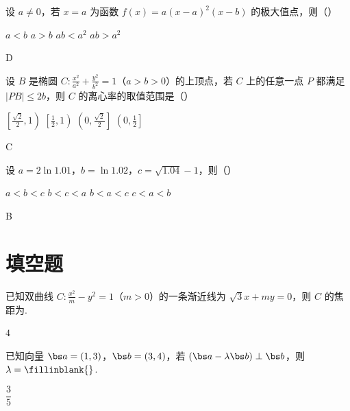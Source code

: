 \begin{problem}
设 \(a\ne 0\)，若 \(x=a\) 为函数 \(f(x)=a(x-a)^2(x-b)\) 的极大值点，则（\quad）

\choices
    {\(a<b\)}
    {\(a>b\)}
    {\(ab<a^2\)}
    {\(ab>a^2\)}

\begin{answer}
D
\end{answer}
\end{problem}

\begin{problem}
设 \(B\) 是椭圆 \(C:\frac{x^2}{a^2}+\frac{y^2}{b^2}=1\)（\(a>b>0\)）的上顶点，若 \(C\) 上的任意一点 \(P\) 都满足 \(|PB|\le 2b\)，则 \(C\) 的离心率的取值范围是（\quad）

\choices
    {\(\left[ \frac{\sqrt2}{2},1 \right)\)}
    {\(\left[ \frac{1}{2},1 \right)\)}
    {\(\left( 0,\frac{\sqrt2}{2} \right]\)}
    {\(\left( 0,\frac{1}{2} \right]\)}

\begin{answer}
C
\end{answer}
\end{problem}

\begin{problem}
设 \(a=2\ln 1.01\)，\(b=\ln 1.02\)，\(c=\sqrt{1.04}-1\)，则（\quad）

\choices
    {\(a<b<c\)}
    {\(b<c<a\)}
    {\(b<a<c\)}
    {\(c<a<b\)}

\begin{answer}
B
\end{answer}
\end{problem}

\section{填空题}

\begin{problem}
已知双曲线 \(C:\frac{x^2}{m}-y^2=1\)（\(m>0\)）的一条渐近线为 \(\sqrt3 x+my=0\)，则 \(C\) 的焦距为\fillinblank{}.
\end{problem}

\begin{answer}
\(4\)
\end{answer}

\begin{problem}
已知向量 \(\bs a=(1,3)\)，\(\bs b=(3,4)\)，若 \((\bs a-\lambda \bs b)\perp \bs b\)，则 \(\lambda=\fillinblank{}\).
\end{problem}

\begin{answer}
\(\dfrac{3}{5}\)
\end{answer}

